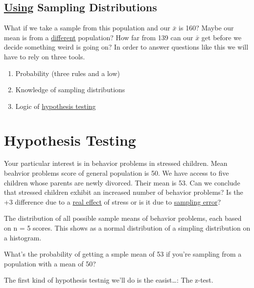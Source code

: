 \documentclass[11pt]{report}
\begin{document}
\subsection{\underline{Using} Sampling Distributions}
What if we take a sample from this population and our $\bar{x}$ is 160? Maybe our mean is from a \underline{different} population?
How far from 139 can our $\bar{x}$ get before we decide something weird is going on? In order to answer questions like this we will have to rely on three tools. \newline 
\begin{enumerate}
    \item Probability (three rules and a low)
    \item Knowledge of sampling distributions
    \item Logic of \underline{hypothesis testing}
\end{enumerate}

\section{Hypothesis Testing}

{
    Your particular interest is in behavior problems in stressed children. Mean beahvior problems score of general population is 50. 
    We have access to five children whose parents are newly divorced. Their mean is 53. \newline\newline 
    Can we conclude that stressed children exhibit an increased number of behavior problems? 
    Is the +3 difference due to a \underline{real effect} of stress or is it due to \underline{sampling error}? \newline\newline 

    The distribution of all possible sample means of behavior problems, each based on n = 5 scores. This shows as a normal distribution of a simpling distribution on a histogram. \newline\newline 

    What's the probability of getting a smple mean of 53 if you're sampling from a population with a mean of 50? \newline\newline 

    The first kind of hypothesis testnig we'll do is the easist\dots: The z-test.
}
\end{document}
